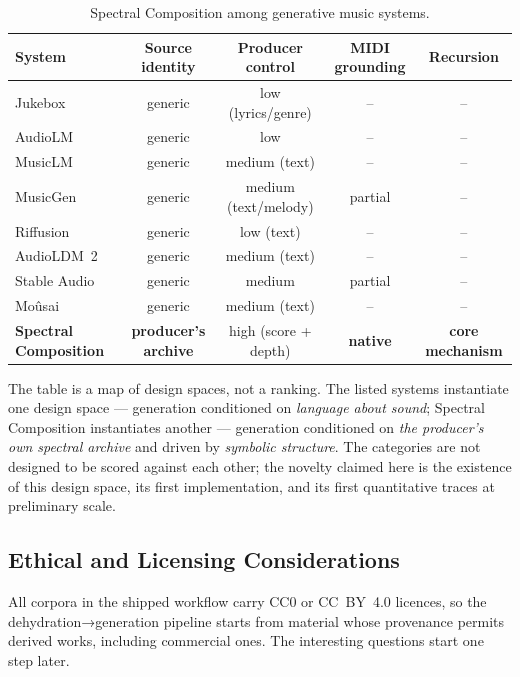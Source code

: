 \documentclass[12pt,a4paper]{article}
\begin{document}
\begin{table}[h]
\centering
\small
\caption{Spectral Composition among generative music systems.}
\begin{tabular}{lcccc}
\toprule
System & Source identity & Producer control & MIDI grounding & Recursion \\
\midrule
Jukebox~\cite{jukebox2020} & generic & low (lyrics/genre) & -- & -- \\
AudioLM~\cite{audiolm2022} & generic & low & -- & -- \\
MusicLM~\cite{musiclm2023} & generic & medium (text) & -- & -- \\
MusicGen~\cite{audiocraft2023} & generic & medium (text/melody) & partial & -- \\
Riffusion~\cite{riffusion2022} & generic & low (text) & -- & -- \\
AudioLDM~2~\cite{audioldm2_2023} & generic & medium (text) & -- & -- \\
Stable Audio~\cite{stableaudio2023} & generic & medium & partial & -- \\
Mo\^usai~\cite{mousai2023} & generic & medium (text) & -- & -- \\
\midrule
\textbf{Spectral Composition} & \textbf{producer's archive} & high
(score + depth) & \textbf{native} & \textbf{core mechanism} \\
\bottomrule
\end{tabular}
\label{tab:systems}
\end{table}

The table is a map of design spaces, not a ranking. The listed systems
instantiate one design space — generation conditioned on \emph{language
about sound}; Spectral Composition instantiates another — generation
conditioned on \emph{the producer's own spectral archive} and driven by
\emph{symbolic structure}. The categories are not designed to be scored
against each other; the novelty claimed here is the existence of this
design space, its first implementation, and its first quantitative
traces at preliminary scale.

\subsection{Ethical and Licensing Considerations}
\label{subsec:disc_ethics}

All corpora in the shipped workflow carry CC0 or CC~BY~4.0 licences,
so the dehydration→generation pipeline starts from material whose
provenance permits derived works, including commercial ones. The
interesting questions start one step later.
\end{document}
